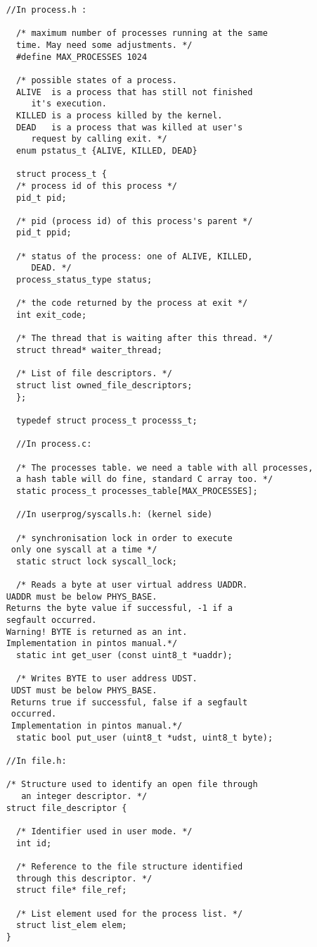     \begin{lstlisting}
    //In process.h :
      
      /* maximum number of processes running at the same 
      time. May need some adjustments. */
      #define MAX_PROCESSES 1024

      /* possible states of a process. 
	  ALIVE  is a process that has still not finished 
		 it's execution. 
	  KILLED is a process killed by the kernel.
	  DEAD 	 is a process that was killed at user's 
		 request by calling exit. */
      enum pstatus_t {ALIVE, KILLED, DEAD}

      struct process_t {
	  /* process id of this process */
	  pid_t pid;				

	  /* pid (process id) of this process's parent */
	  pid_t ppid;				
	  
	  /* status of the process: one of ALIVE, KILLED, 
	     DEAD. */
	  process_status_type status;
      
	  /* the code returned by the process at exit */
	  int exit_code;

	  /* The thread that is waiting after this thread. */
	  struct thread* waiter_thread;

	  /* List of file descriptors. */
	  struct list owned_file_descriptors;
      };
    
      typedef struct process_t processs_t;

      //In process.c: 

      /* The processes table. we need a table with all processes, 
      a hash table will do fine, standard C array too. */
      static process_t processes_table[MAX_PROCESSES];

      //In userprog/syscalls.h: (kernel side)
      
      /* synchronisation lock in order to execute
	 only one syscall at a time */
      static struct lock syscall_lock;

      /* Reads a byte at user virtual address UADDR.
	UADDR must be below PHYS_BASE.
	Returns the byte value if successful, -1 if a 
	segfault occurred. 
	Warning! BYTE is returned as an int.
	Implementation in pintos manual.*/
      static int get_user (const uint8_t *uaddr);

      /* Writes BYTE to user address UDST.
	 UDST must be below PHYS_BASE.
	 Returns true if successful, false if a segfault 
	 occurred. 
	 Implementation in pintos manual.*/
      static bool put_user (uint8_t *udst, uint8_t byte);

    //In file.h:
    
    /* Structure used to identify an open file through 
       an integer descriptor. */
    struct file_descriptor {

      /* Identifier used in user mode. */
      int id;
      
      /* Reference to the file structure identified 
      through this descriptor. */
      struct file* file_ref;
    
      /* List element used for the process list. */
      struct list_elem elem;
    }
    \end{lstlisting}



